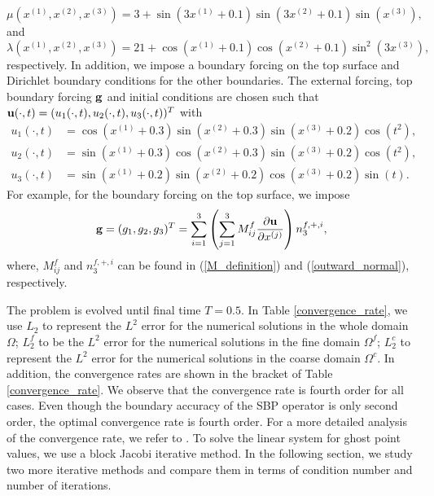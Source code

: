 \begin{equation*}\label{mu_function}
\mu(x^{(1)},x^{(2)},x^{(3)}) = 3 + \sin(3x^{(1)}+0.1)\sin(3x^{(2)}+0.1)\sin(x^{(3)}),
\end{equation*}
and 
\begin{equation*}\label{lambda_function}
\lambda(x^{(1)},x^{(2)},x^{(3)})  = 21+ \cos(x^{(1)}+0.1)\cos(x^{(2)}+0.1)\sin^2(3x^{(3)}),
\end{equation*}
respectively. In addition, we impose a boundary forcing on the top surface and Dirichlet boundary conditions for the other boundaries. The external forcing, top boundary forcing ${\bf g}$ and initial conditions are chosen such that ${\bf u}(\cdot,t) = (u_1(\cdot,t),u_2(\cdot,t),u_3(\cdot,t))^T$ with
\begin{align*}
u_1(\cdot,t) &= \cos(x^{(1)}+0.3)\sin(x^{(2)}+0.3)\sin(x^{(3)}+0.2)\cos(t^2),\\
u_2(\cdot,t) &= \sin(x^{(1)}+0.3)\cos(x^{(2)}+0.3)\sin(x^{(3)}+0.2)\cos(t^2),\\
u_3(\cdot,t) &= \sin(x^{(1)}+0.2)\sin(x^{(2)}+0.2)\cos(x^{(3)}+0.2)\sin(t).
\end{align*}
For example, for the boundary forcing on the top surface, we impose 
\begin{equation*}\label{traction_force}
{\bf g} = (g_1,g_2,g_3)^T = \sum_{i=1}^3\left(\sum_{j = 1}^3 M_{ij}^f\frac{\partial{\bf u}}{\partial x^{(j)}}\right) n^{f,+,i}_3,
\end{equation*}
where, $M_{ij}^f$ and $n^{f,+,i}_3 $ can be found in (\ref{M_definition}) and (\ref{outward_normal}), respectively.

The problem is evolved until final time $T = 0.5$. In Table \ref{convergence_rate}, we use $L_2$ to represent the $L^2$ error for the numerical solutions in the whole domain $\Omega$; $L_2^f$ to be the $L^2$ error for the numerical solutions in the fine domain $\Omega^f$; $L_2^c$ to represent the $L^2$ error for the numerical solutions in the coarse domain $\Omega^c$. In addition, the convergence rates are shown in the bracket of Table \ref{convergence_rate}. We observe that the convergence rate is fourth order for all cases. Even though the boundary accuracy of the SBP operator is only second order, the optimal convergence rate is fourth order. For a more detailed analysis of the convergence rate, we refer to \cite{Wang2017, Wang2018b}.  To solve the linear system for ghost point values, we use a block Jacobi iterative method. In the following section, we study two more iterative methods and compare them in terms of condition number and number of iterations.

